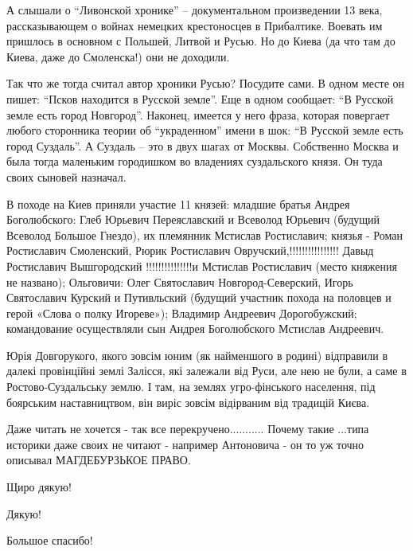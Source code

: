 \begin{itemize}
\begin{itemize}
А слышали о \enquote{Ливонской хронике} – документальном произведении 13 века,
рассказывающем о войнах немецких крестоносцев в Прибалтике. Воевать им пришлось
в основном с Польшей, Литвой и Русью. Но до Киева (да что там до Киева, даже до
Смоленска!) они не доходили.

Так что же тогда считал автор хроники Русью? Посудите сами. В одном месте он
пишет: \enquote{Псков находится в Русской земле}. Еще в одном сообщает: \enquote{В Русской
земле есть город Новгород}. Наконец, имеется у него фраза, которая повергает
любого сторонника теории об \enquote{украденном} имени в шок: \enquote{В Русской земле есть
город Суздаль}. А Суздаль – это в двух шагах от Москвы. Собственно Москва и
была тогда маленьким городишком во владениях суздальского князя. Он туда своих
сыновей назначал.


В походе на Киев приняли участие 11 князей: младшие братья Андрея Боголюбского:
Глеб Юрьевич Переяславский и Всеволод Юрьевич (будущий Всеволод Большое
Гнездо), их племянник Мстислав Ростиславич; князья - Роман Ростиславич
Смоленский, Рюрик Ростиславич Овручский,!!!!!!!!!!!!!!!! Давыд Ростиславич
Вышгородский !!!!!!!!!!!!!!!и Мстислав Ростиславич (место княжения не названо);
Ольговичи: Олег Святославич Новгород-Северский, Игорь Святославич Курский и
Путивльский (будущий участник похода на половцев и герой «Слова о полку
Игореве»); Владимир Андреевич Дорогобужский; командование осуществляли сын
Андрея Боголюбского Мстислав Андреевич.

\end{itemize} %


Юрія Довгорукого, якого зовсім юним (як найменшого в родині) відправили в
далекі провінційні землі Залісся, які залежали від Руси, але нею не були, а
саме в Ростово-Суздальську землю. І там, на землях угро-фінського населення,
під боярським наставництвом, він виріс зовсім відірваним від традицій Києва.


Даже читать не хочется - так все перекручено........... Почему такие ...типа
историки даже своих не читают - например Антоновича - он то уж точно описывал
МАГДЕБУРЗЬКОЕ ПРАВО.

Щиро дякую!

Дякую!

Большое спасибо!


\end{itemize}
